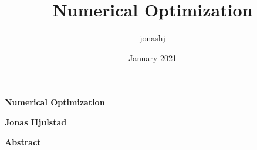 \documentclass{article}
\title{Numerical Optimization}
\author{jonashj }
\date{January 2021}
\begin{document}
\thispagestyle{plain}
\begin{center}
    \Large
    \textbf{Numerical Optimization}
        
    \vspace{0.4cm}
    \large
        
    \vspace{0.4cm}
    \textbf{Jonas Hjulstad}
       
    \vspace{0.9cm}
    \textbf{Abstract}
\end{center}





\end{document}
